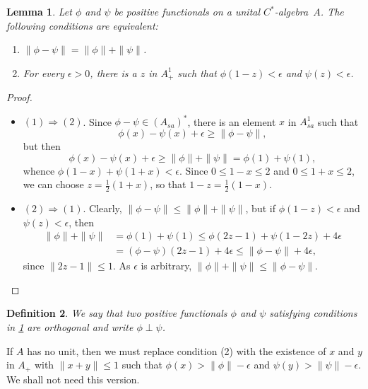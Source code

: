 \documentclass{book}
\newtheorem{definition}{Definition}[section]
\newtheorem{lemma}[definition]{Lemma}
\def\cstar{\(C^*\)-algebra}
\begin{document}
\begin{lemma}\label{Petersen:323}
  Let \(\phi\) and \(\psi\) be positive functionals on a unital \cstar\ \(A\). The following conditions are equivalent:
  \begin{enumerate}
    \item \(\|\phi-\psi\|=\|\phi\|+\|\psi\|\).
    \item For every \(\epsilon>0\), there is a \(z\) in \(A_+^1\) such that \(\phi(1-z)<\epsilon\) and \(\psi(z)<\epsilon\).
  \end{enumerate}
\end{lemma}
\begin{proof}
  \begin{itemize}
    \item \((1)\Rightarrow(2)\). Since \(\phi-\psi\in(A_{sa})^*\), there is an element \(x\) in \(A_{sa}^1\)
      such that
      \[
        \phi(x)-\psi(x)+\epsilon\geq\|\phi-\psi\|,
      \]
      but then 
      \[
        \phi(x)-\psi(x)+\epsilon\geq\|\phi\|+\|\psi\|=\phi(1)+\psi(1),
      \]
      whence \(\phi(1-x)+\psi(1+x)<\epsilon\). Since \(0\leq1-x\leq2\) and \(0\leq1+x\leq2\),
      we can choose \(z=\frac{1}{2}(1+x)\), so that \(1-z=\frac{1}{2}(1-x)\).
    \item \((2)\Rightarrow(1)\). Clearly, \(\|\phi-\psi\|\leq\|\phi\|+\|\psi\|\), but if \(\phi(1-z)<\epsilon\) and \(\psi(z)<\epsilon\), then
      \begin{align*}
        \|\phi\|+\|\psi\|&=\phi(1)+\psi(1)\leq\phi(2z-1)+\psi(1-2z)+4\epsilon\\
        &=(\phi-\psi)(2z-1)+4\epsilon\leq\|\phi-\psi\|+4\epsilon,
  \end{align*}
  since \(\|2z-1\|\leq1\). As \(\epsilon\) is arbitrary, \(\|\phi\|+\|\psi\|\leq\|\phi-\psi\|\).
  \end{itemize}
\end{proof}

\begin{definition}
  We say that two positive functionals \(\phi\) and \(\psi\) satisfying conditions in \ref{Petersen:323} are \textnormal{orthogonal}
  and write \(\phi\perp\psi\). 
\end{definition}
If \(A\) has no unit, then we must replace condition (2) with the existence of \(x\) and \(y\) in \(A_+\)
with \(\|x+y\|\leq1\) such that \(\phi(x)>\|\phi\|-\epsilon\) and \(\psi(y)>\|\psi\|-\epsilon\). We shall not need this version.
\end{document}
